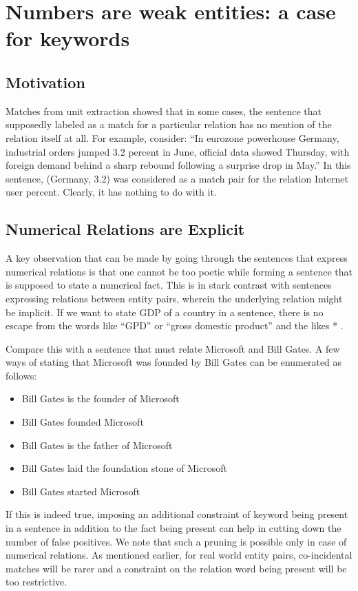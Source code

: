 \documentclass[a4paper,10pt]{article}
\begin{document}
\section{Numbers are weak entities: a case for keywords}

\subsection{Motivation}
Matches from unit extraction showed that in some cases, the sentence that supposedly labeled as a
match for a particular relation has no mention of the relation itself at all.
For example, consider:
“In eurozone powerhouse Germany, industrial orders jumped 3.2 percent in June, official data
showed Thursday, with foreign demand behind a sharp rebound following a surprise drop in May.”
In this sentence, (Germany, 3.2) was considered as a match pair for the relation Internet user
percent. Clearly, it has nothing to do with it.

\subsection{Numerical Relations are Explicit}
A key observation that can be made by going through the sentences that express numerical relations
is that one cannot be too poetic while forming a sentence that is supposed to state a numerical fact.
This is in stark contrast with sentences expressing relations between entity pairs, wherein the
underlying relation might be implicit. If we want to state GDP of a country in a sentence, there is no
escape from the words like “GPD” or “gross domestic product” and the likes * .

Compare this with a sentence that must relate Microsoft and Bill Gates. A few ways of stating that
Microsoft was founded by Bill Gates can be enumerated as follows:
\begin{itemize}
\item Bill Gates is the founder of Microsoft
\item Bill Gates founded Microsoft
\item Bill Gates is the father of Microsoft
\item Bill Gates laid the foundation stone of Microsoft
\item Bill Gates started Microsoft
\end{itemize}

If this is indeed true, imposing an additional constraint of keyword being present in a sentence in
addition to the fact being present can help in cutting down the number of false positives. We note
that such a pruning is possible only in case of numerical relations. As mentioned earlier, for real
world entity pairs, co-incidental matches will be rarer and a constraint on the relation word being
present will be too restrictive.
\end{document}

